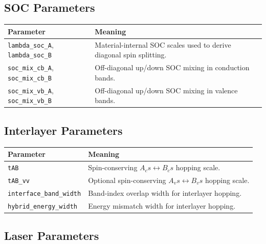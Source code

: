 \documentclass[11pt,a4paper]{article}
\begin{document}
\subsection{SOC Parameters}

\begin{longtable}{p{}p{}}
\toprule
Parameter & Meaning \\
\midrule
\texttt{lambda\_soc\_A}, \texttt{lambda\_soc\_B} & Material-internal SOC scales used to derive diagonal spin splitting. \\
\texttt{soc\_mix\_cb\_A}, \texttt{soc\_mix\_cb\_B} & Off-diagonal up/down SOC mixing in conduction bands. \\
\texttt{soc\_mix\_vb\_A}, \texttt{soc\_mix\_vb\_B} & Off-diagonal up/down SOC mixing in valence bands. \\
\bottomrule
\end{longtable}

\subsection{Interlayer Parameters}

\begin{longtable}{p{}p{}}
\toprule
Parameter & Meaning \\
\midrule
\texttt{tAB} & Spin-conserving $A_c s\leftrightarrow B_c s$ hopping scale. \\
\texttt{tAB\_vv} & Optional spin-conserving $A_v s\leftrightarrow B_v s$ hopping scale. \\
\texttt{interface\_band\_width} & Band-index overlap width for interlayer hopping. \\
\texttt{hybrid\_energy\_width} & Energy mismatch width for interlayer hopping. \\
\bottomrule
\end{longtable}

\subsection{Laser Parameters}
\end{document}
